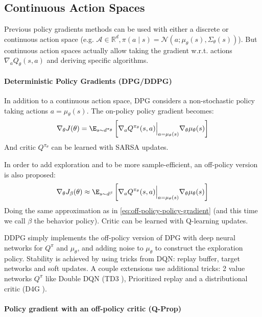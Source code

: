 \subsection{Continuous Action Spaces}
Previous policy gradients methods can be used with either a discrete or continuous action space (e.g. $\mathcal{A} \in \mathbb{R}^d, \pi(a\mid s) = \mathcal{N}(a; \mu_\theta(s), \Sigma_\theta(s))$). But continuous action spaces actually allow taking the gradient w.r.t. actions $\nabla_a Q_\theta(s,a)$ and deriving specific algorithms.

\paragraph{Deterministic Policy Gradients (DPG/DDPG)} \cite{silver2014deterministic} \cite{lillicrap2015continuous}
In addition to a continuous action space, DPG considers a non-stochastic policy taking actions $a = \mu_\theta(s)$. The on-policy policy gradient becomes:
\begin{equation}
    \nabla_\theta J(\theta) = \E_{s\sim d^{\pi_\theta}} \left[
        \nabla_a Q^{\pi_\theta}(s,a) \Bigr|_{a=\mu_\theta(s)} \nabla_\theta \mu_\theta(s)
    \right]
\end{equation}
And critic $Q^{\pi_\theta}$ can be learned with SARSA updates.

In order to add exploration and to be more sample-efficient, an off-policy version is also proposed:
\begin{equation}
    \nabla_\theta J_\beta(\theta) \approx \E_{s\sim d^\beta} \left[
        \nabla_a Q^{\pi_\theta}(s,a) \Bigr|_{a=\mu_\theta(s)} \nabla_\theta \mu_\theta(s)
    \right]
\end{equation}
Doing the same approximation as in \ref{eq:off-policy-policy-gradient} (and this time we call $\beta$ the behavior policy). Critic can be learned with Q-learning updates.

DDPG simply implements the off-policy version of DPG with deep neural networks for $Q^\pi$ and $\mu_\theta$, and adding noise to $\mu_\theta$ to construct the exploration policy. Stability is achieved by using tricks from DQN: replay buffer, target networks and soft updates. A couple extensions use additional tricks: 2 value networks $Q^\pi$ like Double DQN (TD3 \cite{fujimoto2018addressing}), Prioritized replay and a distributional critic (D4G \cite{barth2018distributed}).


\paragraph{Policy gradient with an off-policy critic (Q-Prop)}
